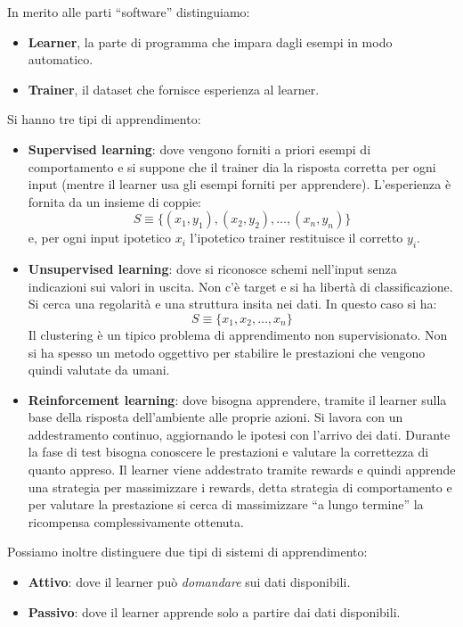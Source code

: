 In merito alle parti “software” distinguiamo:
\begin{itemize}
    \item \textbf{Learner}, la parte di programma che impara dagli esempi in modo
          automatico.
    \item \textbf{Trainer}, il dataset che fornisce esperienza al learner.
\end{itemize}
Si hanno tre tipi di apprendimento:
\begin{itemize}
    \item \textbf{Supervised learning}: dove vengono forniti a priori esempi di
          comportamento e si suppone che il trainer dia la risposta corretta per
          ogni input (mentre il learner usa gli esempi forniti per apprendere).
          L'esperienza è fornita da un insieme di coppie:
          \begin{equation}
              S \equiv \{(x_1, y_1), (x_2, y_2), \dots, (x_n, y_n)\}
          \end{equation}
          e, per ogni input ipotetico $x_i$ l'ipotetico trainer restituisce il
          corretto $y_i$.
    \item \textbf{Unsupervised learning}: dove si riconosce schemi nell'input senza
          indicazioni sui valori in uscita. Non c'è target e si ha libertà di classificazione.
          Si cerca una regolarità e una struttura insita nei dati. In questo caso si ha:
          \begin{equation}
              S \equiv \{x_1, x_2, \dots, x_n\}
          \end{equation}
          Il clustering è un tipico problema di apprendimento non supervisionato.
          Non si ha spesso un metodo oggettivo per stabilire le prestazioni che
          vengono quindi valutate da umani.
    \item \textbf{Reinforcement learning}: dove bisogna apprendere, tramite il
          learner sulla base della risposta dell'ambiente alle proprie azioni. Si lavora
          con un addestramento continuo, aggiornando le ipotesi con l'arrivo dei dati.
          Durante la fase di test bisogna conoscere le prestazioni e valutare la correttezza
          di quanto appreso. Il learner viene addestrato tramite rewards e quindi apprende
          una strategia per massimizzare i rewards, detta strategia di comportamento e
          per valutare la prestazione si cerca di massimizzare “a lungo termine” la
          ricompensa complessivamente ottenuta.
\end{itemize}
Possiamo inoltre distinguere due tipi di sistemi di apprendimento:
\begin{itemize}
    \item \textbf{Attivo}: dove il learner può \textit{domandare} sui dati disponibili.
    \item \textbf{Passivo}: dove il learner apprende solo a partire dai dati disponibili.
\end{itemize}

